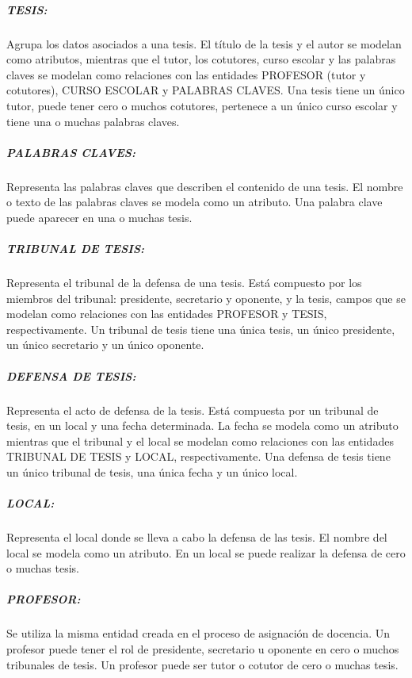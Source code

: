 \subparagraph{TESIS:}
Agrupa los datos asociados a una tesis.
El título de la tesis y el autor se modelan como atributos, mientras que
el tutor, los cotutores, curso escolar y las palabras claves se modelan como relaciones con 
las entidades PROFESOR (tutor y cotutores), CURSO ESCOLAR y PALABRAS CLAVES.
Una tesis tiene un único tutor, puede tener cero o muchos cotutores, pertenece a 
un único curso escolar y tiene una o muchas palabras claves. 

\subparagraph{PALABRAS CLAVES:}
Representa las palabras claves que describen el contenido de una tesis.
El nombre o texto de las palabras claves se modela como un atributo. Una 
palabra clave puede aparecer en una o muchas tesis. 


\subparagraph{TRIBUNAL DE TESIS:}
Representa el tribunal de la defensa de una tesis.
Está compuesto por los miembros del tribunal: presidente, secretario y oponente, 
y la tesis, campos que se modelan como relaciones con las entidades PROFESOR y TESIS, respectivamente.
Un tribunal de tesis tiene una única tesis, un único presidente, un único secretario y 
un único oponente.


\subparagraph{DEFENSA DE TESIS:}
Representa el acto de defensa de la tesis. 
Está compuesta por un tribunal de tesis, en un local y una 
fecha determinada. La fecha se modela como un atributo mientras que 
el tribunal y el local se modelan como relaciones con las entidades TRIBUNAL DE 
TESIS y LOCAL, respectivamente. Una defensa de tesis tiene un único tribunal de tesis,
una única fecha y un único local.



\subparagraph{LOCAL:}
Representa el local donde se lleva a cabo la defensa de las tesis.
El nombre del local se modela como un atributo. 
En un local se puede realizar la defensa de cero o muchas tesis.


\subparagraph{PROFESOR:}
Se utiliza la misma entidad creada en el proceso de asignación de docencia.
Un profesor puede tener el rol de presidente, secretario u oponente en cero o 
muchos tribunales de tesis. Un profesor puede ser 
tutor o cotutor de cero o muchas tesis. \\





